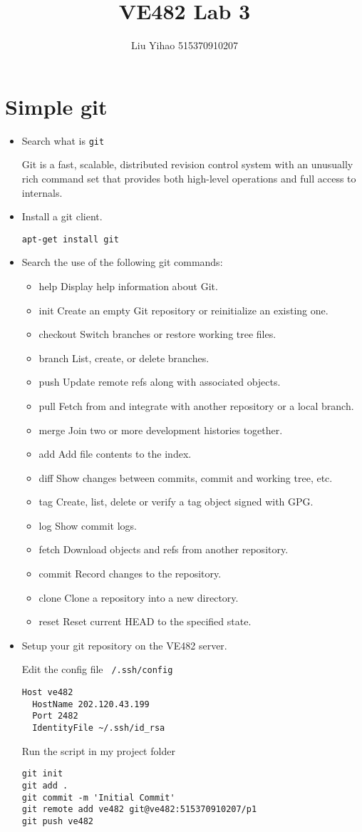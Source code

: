 \documentclass{article}
\title{VE482 Lab 3}
\author{Liu Yihao 515370910207}
\date{}
\begin{document}
\maketitle

\section{Simple git}
\begin{itemize}
\item Search what is \texttt{git} 

Git is a fast, scalable, distributed revision control system with
       an unusually rich command set that provides both high-level
       operations and full access to internals.
\item Install a git client.
\begin{verbatim}
apt-get install git
\end{verbatim}
\item Search the use of the following git commands:
\begin{itemize}
\item help Display help information about Git.
\item init Create an empty Git repository or reinitialize an existing one.
\item checkout Switch branches or restore working tree files.
\item branch List, create, or delete branches.
\item push Update remote refs along with associated objects.
\item pull Fetch from and integrate with another repository or a local branch.
\item merge Join two or more development histories together.
\item add Add file contents to the index.
\item diff Show changes between commits, commit and working tree, etc.
\item tag Create, list, delete or verify a tag object signed with GPG.
\item log Show commit logs.
\item fetch Download objects and refs from another repository.
\item commit Record changes to the repository.
\item clone Clone a repository into a new directory.
\item reset Reset current HEAD to the specified state.
\end{itemize}
\item Setup your git repository on the VE482 server.

Edit the config file \texttt{~/.ssh/config}
\begin{verbatim}
Host ve482
  HostName 202.120.43.199
  Port 2482
  IdentityFile ~/.ssh/id_rsa
\end{verbatim}
Run the script in my project folder
\begin{verbatim}
git init
git add .
git commit -m 'Initial Commit'
git remote add ve482 git@ve482:515370910207/p1
git push ve482
\end{verbatim}
\end{itemize}
\end{document}
